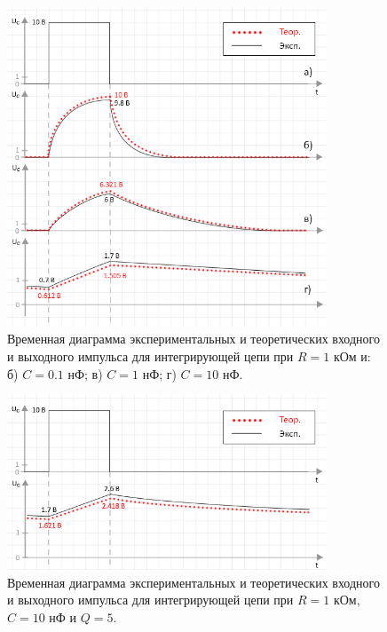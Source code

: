 \documentclass[a4paper,14pt]{extarticle}
\begin{document}
\begin{figure}[H]
\begin{center}
	\includegraphics[width=0.85\textwidth]{int_with_theory}
	\captionsetup{justification=centering}
	\caption{Временная диаграмма экспериментальных и теоретических входного и выходного импульса для интегрирующей цепи при $R = 1$ кОм и: б) $C = 0.1$ нФ; в) $C = 1$ нФ; г) $C = 10$ нФ.} 
	\label{fig:int}
\end{center}
\end{figure}

\renewcommand\belowcaptionskip{-20pt}

\begin{figure}[H]
\begin{center}
	\includegraphics[width=0.85\textwidth]{q5_with_theory}
	\captionsetup{justification=centering}
	\caption{Временная диаграмма экспериментальных и теоретических входного и выходного импульса для интегрирующей цепи при $R = 1$ кОм, $C = 10$ нФ и $Q = 5$.} 
	\label{fig:int_q5}
\end{center}
\end{figure}
\end{document}
